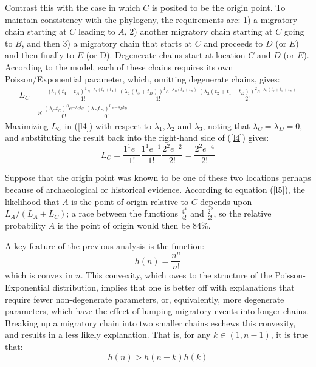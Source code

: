 \documentclass[11pt]{article}
\begin{document}
Contrast this with the case in which $C$ is posited to be the origin point. To maintain consistency with the phylogeny, the requirements are:  1) a migratory chain starting at $C$ leading to $A$, 2) another migratory chain starting at $C$ going to $B$, and then 3) a migratory chain that starts at $C$ and proceeds to $D$ (or $E$) and then finally to $E$ (or D). Degenerate chains start at location $C$ and $D$ (or $E$). According to the model, each of these chains requires its own Poisson/Exponential parameter, which, omitting degenerate chains, gives:
\begin{eqnarray} \label{l4}
L_{C}&=\frac{(\lambda_1(t_4+t_A)^1e^{-\lambda_1(t_4+t_A)}}{1!}\frac{(\lambda_2(t_3+t_B))^1e^{-\lambda_B(t_3+t_B)}}{1!}
\frac{(\lambda_3(t_2+t_1+t_E))^2e^{-\lambda_3(t_2+t_1+t_E)}}{2!} \nonumber \\
&\times\frac{(\lambda_Ct_C)^0e^{-\lambda_Ct_C}}{0!}\frac{(\lambda_Dt_D)^0e^{-\lambda_Dt_D}}{0!}
\end{eqnarray} 
Maximizing $L_{C}$ in (\ref{l4}) with respect to $\lambda_1,\lambda_2$ and $\lambda_3$, noting that $\lambda_C=\lambda_D=0$, and substituting the result back into the right-hand side of (\ref{l4}) gives:
\begin{equation} \label{l5}
L_{C}=\frac{1^1e^{-}}{1!}\frac{1^{1}e^{-1}}{1!}\frac{2^2e^{-2}}{2!}=
\frac{2^2e^{-4}}{2!}
\end{equation} 

Suppose that the origin point was known to be one of these two locations perhaps because of archaeological or historical evidence. According to equation (\ref{l5}), the likelihood that $A$ is the point of origin relative to $C$ depends upon $L_{A} /(L_A+L_C)$; a race between the functions $\frac{4^4}{4!}$ and $\frac{2^2}{2!}$, so the relative probability  $A$ is the point of origin would then be 84\%. 

A key feature of the previous analysis is the function: 
\begin{equation*}
h(n)=\frac{n^n}{n!}
\end{equation*}
which is convex in $n$. This convexity, which owes to the structure of the Poisson-Exponential distribution, implies that one is better off with explanations that require fewer non-degenerate parameters, or, equivalently, more degenerate parameters, which have the effect of lumping migratory events into longer chains. Breaking up a migratory chain into two smaller chains eschews this convexity, and results in a less likely explanation. That is, for any  $k \in (1,n-1)$, it is true that:
\begin{equation*}
h(n) > h(n-k)h(k)
\end{equation*} 
\end{document}
